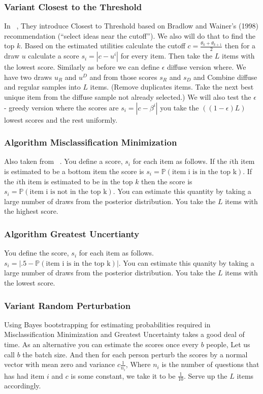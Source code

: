\documentclass[nonblindrev]{informs3}
\begin{document}
\subsubsection{Variant Closest to the Threshold}
In ~\cite{toubia2007adaptive},  They introduce Closest to Threshold based on Bradlow and Wainer’s (1998) recommendation
(``select ideas near the cutoff''). We also will do that to find the top $k$. Based on the estimated utilities calculate the cutoff $c=\frac{\theta_k+\theta_{k+1}}{2}$ then for a draw $u$ calculate a score $s_i=|c-u^i|$ for every item. Then take the $L$ items with the lowest score. Similarly as before we can define $\epsilon$ diffuse version where. We have two draws $u_R$ and $u^D$ and from those scores $s_R$ and $s_D$ and Combine diffuse and regular samples into $L$ items. (Remove duplicates items. Take the next best unique item from the diffuse sample not already selected.) We will also test the $\epsilon$ - greedy version where the scores are $s_i=|c-\beta^i|$ you take the $((1-\epsilon)L)$ lowest scores and the rest uniformly.

\subsubsection{Algorithm Misclassification Minimization}
Also taken from ~\cite{toubia2007adaptive}. You define a score, $s_i$ for each item as follows. If the $i$th item is estimated to be a bottom item the score is $s_i=\mathbb{P}(\text{item i is in the top k})$. If the $i$th  item is estimated to be in the top $k$ then the score is $s_i=\mathbb{P}(\text{item i is not in the top k})$. You can estimate this quantity by taking a large number of draws from the posterior distribution. You take the $L$ items with the highest score.

\subsubsection{Algorithm Greatest Uncertianty}
You define the score, $s_i$ for each item as follows. $s_i=|.5-\mathbb{P}(\text{item i is in the top k})|$. You can estimate this quanity by taking a large number of draws from the posterior distribution. You take the $L$ items with the lowest score.

\subsubsection{Variant Random Perturbation}
Using Bayes bootstrapping for estimating probabilities required in Misclassification Minimization and Greatest Uncertainty takes a good deal of time. As an alternative you can estimate the scores once every $b$ people, Let us call $b$ the batch size. And then for each person perturb the scores by a normal vector with mean zero and variance $c\frac{1}{n_i}$, Where $n_i$ is the number of questions that has had item $i$ and $c$ is some constant, we take it to be $\frac{1}{10}$. Serve up the $L$ items accordingly.   
\end{document}
